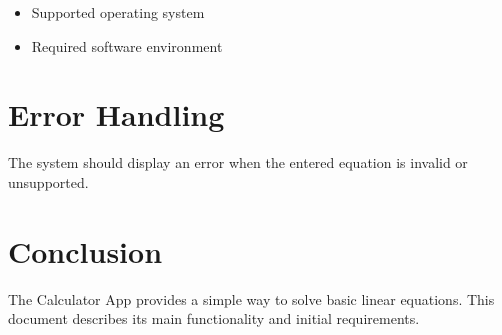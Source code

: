\documentclass[12pt,a4paper]{article}
\begin{document}
\begin{itemize}
    \item Supported operating system
    \item Required software environment
\end{itemize}

\section{Error Handling}

The system should display an error when the entered equation
is invalid or unsupported.

\section{Conclusion}

The Calculator App provides a simple way to solve basic linear
equations. This document describes its main functionality and
initial requirements.
\end{document}
